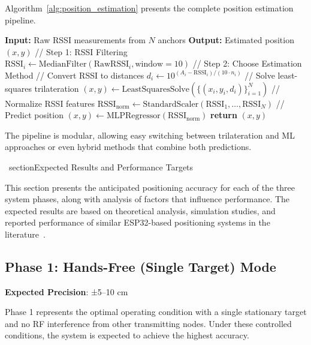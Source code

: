 Algorithm~\ref{alg:position_estimation} presents the complete position estimation pipeline.

\begin{algorithm}[H]
\caption{Position Estimation Pipeline}
\label{alg:position_estimation}
\begin{algorithmic}[1]
\STATE \textbf{Input:} Raw RSSI measurements from $N$ anchors
\STATE \textbf{Output:} Estimated position $(x, y)$
\STATE
\STATE // Step 1: RSSI Filtering
    \STATE $\text{RSSI}_i \gets \text{MedianFilter}(\text{RawRSSI}_i, \text{window}=10)$
\ENDFOR
\STATE
\STATE // Step 2: Choose Estimation Method
    \STATE // Convert RSSI to distances
        \STATE $d_i \gets 10^{(A_i - \text{RSSI}_i)/(10 \cdot n_i)}$
    \ENDFOR
    \STATE // Solve least-squares trilateration
    \STATE $(x, y) \gets \text{LeastSquaresSolve}(\{(x_i, y_i, d_i)\}_{i=1}^N)$
    \STATE // Normalize RSSI features
    \STATE $\text{RSSI}_{\text{norm}} \gets \text{StandardScaler}(\text{RSSI}_1, \ldots, \text{RSSI}_N)$
    \STATE // Predict position
    \STATE $(x, y) \gets \text{MLPRegressor}(\text{RSSI}_{\text{norm}})$
\ENDIF
\STATE
\STATE \textbf{return} $(x, y)$
\end{algorithmic}
\end{algorithm}

The pipeline is modular, allowing easy switching between trilateration and ML approaches or even hybrid methods that combine both predictions.

\
section{Expected Results and Performance Targets}
\label{sec:expected_results}

This section presents the anticipated positioning accuracy for each of the three system phases, along with analysis of factors that influence performance. The expected results are based on theoretical analysis, simulation studies, and reported performance of similar ESP32-based positioning systems in the literature~\cite{sadowski2018rssi, jimenez2018indoor, yassin2017recent}.

\subsection{Phase 1: Hands-Free (Single Target) Mode}

\textbf{Expected Precision}: ±5--10 cm

Phase 1 represents the optimal operating condition with a single stationary target and no RF interference from other transmitting nodes. Under these controlled conditions, the system is expected to achieve the highest accuracy.

